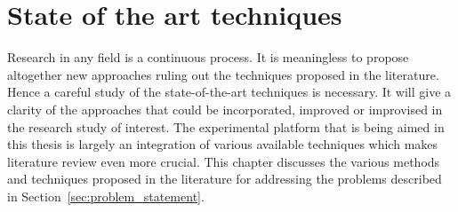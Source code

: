 \chapter{State of the art techniques}

\label{Chapter2} %

 Research in any field is a continuous process. It is meaningless to propose altogether new approaches ruling out the techniques proposed in the literature. Hence a careful study of the state-of-the-art techniques is necessary. It will give a clarity of the approaches that could be incorporated, improved or improvised in the research study of interest. The experimental platform that is being aimed in this thesis is largely an integration of various available techniques which makes literature review even more crucial. This chapter discusses the various methods and techniques proposed in the literature for addressing the problems described in Section~\ref{sec:problem_statement}.
